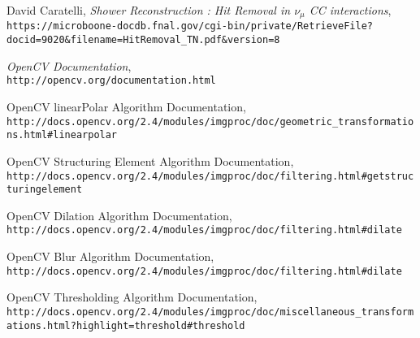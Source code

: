 \begin{thebibliography}{20}
  David Caratelli, \emph{Shower Reconstruction : Hit Removal in $\nu_{\mu}$ CC interactions},\\
  \texttt{https://microboone-docdb.fnal.gov/cgi-bin/private/RetrieveFile?docid=9020\&filename=HitRemoval\_TN.pdf\&version=8}

  
  \emph{OpenCV Documentation},\\
  \texttt{http://opencv.org/documentation.html}

%

  OpenCV linearPolar Algorithm Documentation, \\
  \texttt{http://docs.opencv.org/2.4/modules/imgproc/doc/geometric\_transformations.html\#linearpolar}

  OpenCV Structuring Element Algorithm Documentation, \\
  \texttt{http://docs.opencv.org/2.4/modules/imgproc/doc/filtering.html\#getstructuringelement}

  OpenCV Dilation Algorithm Documentation, \\
  \texttt{http://docs.opencv.org/2.4/modules/imgproc/doc/filtering.html\#dilate}

  OpenCV Blur Algorithm Documentation, \\
  \texttt{http://docs.opencv.org/2.4/modules/imgproc/doc/filtering.html\#dilate}
  
  OpenCV Thresholding Algorithm Documentation, \\
  \texttt{http://docs.opencv.org/2.4/modules/imgproc/doc/miscellaneous\_transformations.html?highlight=threshold\#threshold}
  

\end{thebibliography}
